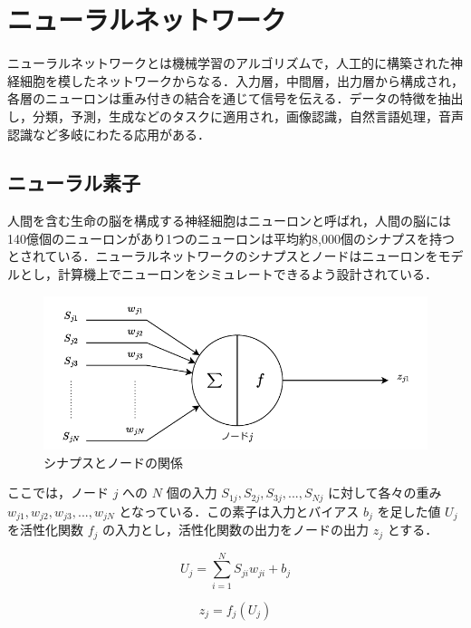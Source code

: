 \section{ニューラルネットワーク}
ニューラルネットワークとは機械学習のアルゴリズムで，人工的に構築された神経細胞を模したネットワークからなる．入力層，中間層，出力層から構成され，各層のニューロンは重み付きの結合を通じて信号を伝える\cite{深層学習}．データの特徴を抽出し，分類，予測，生成などのタスクに適用され，画像認識，自然言語処理，音声認識など多岐にわたる応用がある．

\subsection{ニューラル素子}
人間を含む生命の脳を構成する神経細胞はニューロンと呼ばれ，人間の脳には140億個のニューロンがあり1つのニューロンは平均約8,000個のシナプスを持つとされている．ニューラルネットワークのシナプスとノードはニューロンをモデルとし，計算機上でニューロンをシミュレートできるよう設計されている\cite{深層学習}．

\begin{figure}[h]
    \begin{center}
        \includegraphics[scale=0.8]{img/expnode.pdf}
        \caption{シナプスとノードの関係}
    \end{center}
\end{figure}

ここでは，ノード $ j $ への $ N $ 個の入力 $ S_{1j}, S_{2j}, S_{3j}, ..., S_{Nj} $ に対して各々の重み $ w_{j1}, w_{j2}, w_{j3}, ..., w_{jN} $ となっている．この素子は入力とバイアス $ b_{j} $ を足した値 $ U_{j} $ を活性化関数 $ f_{j} $ の入力とし，活性化関数の出力をノードの出力 $ z_{j} $ とする．

\begin{equation}
    U_{j} = \sum_{i=1}^N S_{ji}w_{ji} + b_{j}
\end{equation}

\begin{equation}
    z_{j} = f_{j}(U_{j})
\end{equation}

